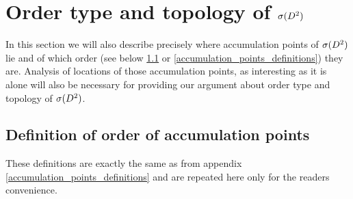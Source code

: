 


\section{Order type and topology of ${{\sigma}(D^2)}$}


In this section we will also describe precisely where accumulation points of ${{\sigma}(D^2)}$ lie and of 
 which order 
(see below \ref{accumulation_points_definitions repetition} or 
\ref{accumulation_points_definitions}) they are. Analysis of locations of those 
accumulation points, as interesting as it is alone will also be necessary for providing 
our argument about order type and topology of ${{\sigma}(D^2)}$. 
\subsection{Definition of order of accumulation points}
\label{accumulation_points_definitions repetition} 
These definitions are exactly the same as from appendix \ref{accumulation_points_definitions} and 
are repeated here only for the readers convenience.

